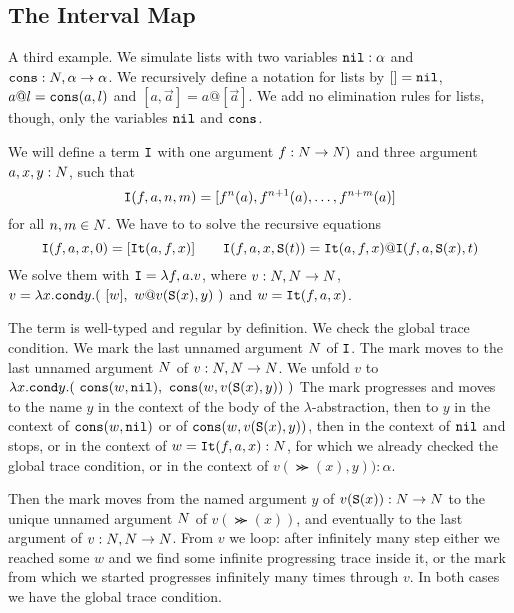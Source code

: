 \documentclass{article}
\begin{document}
\subsection{The Interval Map}
A third example. We simulate lists with two variables ${\tt nil}:\alpha$ and 
${\tt cons}:{N},\alpha \rightarrow \alpha$. We recursively define a notation for lists by $[]={\tt nil}$,
$a @ l={\tt cons}(a,l)$ and $[a,\vec{a}] = a @ [\vec{a}]$. We add no elimination rules for lists, though,
only the variables ${\tt nil}$ and ${\tt cons}$.

We will define a term ${\tt I}$ with one argument $f:{N} \rightarrow {N})$ and three argument
$a,x,y:{N}$, such that 
$$
{\tt I}(f,a,n,m) = [f^n(a), f^{n+1}(a), \ldots, f^{n+m}(a)]
$$ 
for all $n,m \in {N}$. 
We have to to solve the recursive equations 
$$
\Interval(f,a,x,0) = [\Iter(a,f,x)]
\ \ \ \ \ \ 
\Interval(f,a,x,\Succ (t)) = \Iter(a,f,x) @ \Interval(f,a,\Succ(x),t)
$$ 
We solve them with ${\tt I} = \lambda f,a.v$,
where $v:{N},{N}\rightarrow {N}$, 
$v = \lambda x.{\tt cond} y. (\ [w],  \  w @ v({\tt S} (x),y) \ )$ and $w={\tt It}(f,a,x)$.

The term is well-typed and regular by definition. We check the global trace condition.
We mark the last unnamed argument ${N}$ of ${\tt I}$.
The mark moves to the last unnamed argument ${N}$ of  
$v:{N},{N} \rightarrow {N}$. 
We unfold $v$ to $\lambda x.{\tt cond} y. 
(\ {\tt cons}(w, {\tt nil}),  \  {\tt cons}(w, v({\tt S} (x),y)) \ )$
The mark progresses and moves to the name $y$ in the context of the body of the $\lambda$-abstraction,
then to $y$ in the context of ${\tt cons}(w, {\tt nil})$ or of ${\tt cons}(w, v({\tt S} (x),y))$,
then in the context of ${\tt nil}$ and stops, or in the context of $w={\tt It}(f,a,x):{N}$, 
for which we already checked the global trace condition, or in the context of $v(\Succ (x),y)):\alpha$. 

Then the mark moves from the named argument $y$ of $v({\tt S} (x)):{N} \rightarrow {N}$ to the unique 
unnamed argument ${N}$ of $v(\Succ (x))$, and eventually to the last argument of $v:{N},{N}\rightarrow {N}$. 
From $v$ we loop: after infinitely many step either we reached some $w$ and we find 
some infinite progressing trace inside it, or the
mark from which we started progresses infinitely many times through $v$. In both cases we have the
global trace condition.
\end{document}
